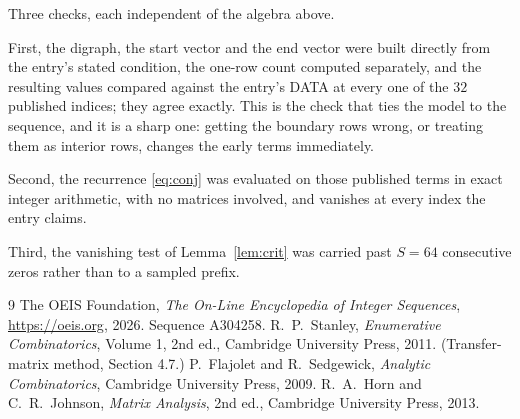 \documentclass[11pt,a4paper]{article}
\theoremstyle{plain}
\theoremstyle{definition}
\begin{document}
Three checks, each independent of the algebra above.

First, the digraph, the start vector and the end vector were built directly from the
entry's stated condition, the one-row count computed separately, and the resulting values
compared against the entry's DATA at every one of the $32$ published indices; they
agree exactly. This is the check that ties the model to the sequence, and it is a sharp one:
getting the boundary rows wrong, or treating them as interior rows, changes the early terms
immediately.

Second, the recurrence \eqref{eq:conj} was evaluated on those published terms in exact
integer arithmetic, with no matrices involved, and vanishes at every index the entry claims.

Third, the vanishing test of Lemma~\ref{lem:crit} was carried past $S=64$ consecutive
zeros rather than to a sampled prefix.

\begin{thebibliography}{9}
 The OEIS Foundation, \emph{The On-Line Encyclopedia of Integer
Sequences}, \url{https://oeis.org}, 2026. Sequence A304258.
 R.~P.~Stanley, \emph{Enumerative Combinatorics}, Volume 1, 2nd ed.,
Cambridge University Press, 2011. (Transfer-matrix method, Section 4.7.)
 P.~Flajolet and R.~Sedgewick, \emph{Analytic Combinatorics}, Cambridge
University Press, 2009.
 R.~A.~Horn and C.~R.~Johnson, \emph{Matrix Analysis}, 2nd ed., Cambridge
University Press, 2013.
\end{thebibliography}
\end{document}
